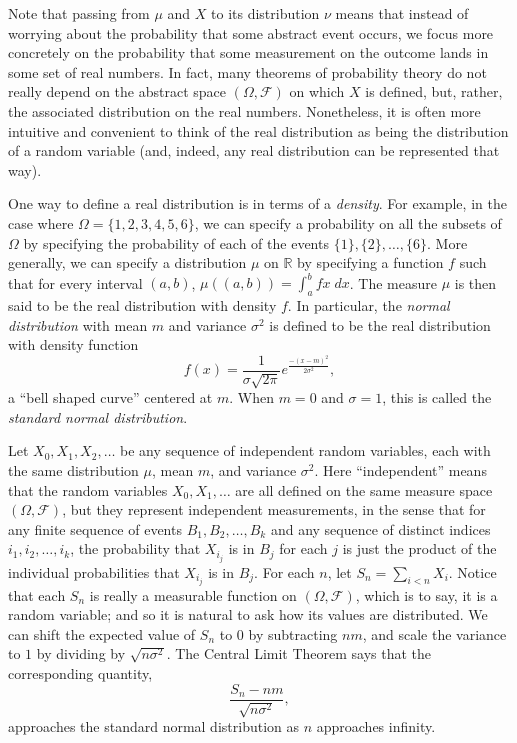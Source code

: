 \documentclass{svjour3}
\newcommand{\RR}{\mathbb{R}}
\newcommand{\mdl}[1]{{\mathcal #1}} %
\begin{document}
Note that passing from $\mu$ and $X$ to its distribution $\nu$ means that instead of worrying about the probability that some abstract event occurs, we focus more concretely on the probability that some measurement on the outcome lands in some set of real numbers. In fact, many theorems of probability theory do not really depend on the abstract space $(\Omega, \mdl F)$ on which $X$ is defined, but, rather, the associated distribution on the real numbers. Nonetheless, it is often more intuitive and convenient to think of the real distribution as being the distribution of a random variable (and, indeed, any real distribution can be represented that way). 

One way to define a real distribution is in terms of a \emph{density}. For example, in the case where $\Omega = \{1, 2, 3, 4, 5, 6\}$, we can specify a probability on all the subsets of $\Omega$ by specifying the probability of each of the events $\{1\}, \{2\}, \ldots, \{6\}$. More generally, we can specify a distribution $\mu$ on $\RR$ by specifying a function $f$ such that for every interval $(a, b)$, $\mu((a, b)) = \int_a^b f x \; \mathit{dx}$. The measure $\mu$ is then said to be the real distribution with density $f$. In particular, the \emph{normal distribution} with mean $m$ and variance $\sigma^2$ is defined to be the real distribution with density function
\[
f(x) = \frac{1}{\sigma \sqrt{2 \pi}} e^\frac{-(x - m)^2}{2 \sigma^2}, 
\]
a ``bell shaped curve'' centered at $m$. When $m = 0$ and $\sigma = 1$, this is called the \emph{standard normal distribution}.

Let $X_0, X_1, X_2, \ldots$ be any sequence of independent random variables, each with the same distribution $\mu$, mean $m$, and variance $\sigma^2$. Here ``independent'' means that the random variables $X_0, X_1, \ldots$ are all defined on the same measure space $(\Omega, \mdl F)$, but they represent independent measurements, in the sense that for any finite sequence of events $B_1, B_2, \ldots, B_k$ and any sequence of distinct indices $i_1, i_2, \ldots, i_k$, the probability that $X_{i_j}$ is in $B_j$ for each $j$ is just the product of the individual probabilities that $X_{i_j}$ is in $B_j$. For each $n$, let $S_n = \sum_{i < n} X_i$. Notice that each $S_n$ is really a measurable function on $(\Omega, \mdl F)$, which is to say, it is a random variable; and so it is natural to ask how its values are distributed. We can shift the expected value of $S_n$ to $0$ by subtracting $n m$, and scale the variance to $1$ by dividing by $\sqrt{ n \sigma^2}$. The Central Limit Theorem says that the corresponding quantity,
\[
 \frac{S_n - nm}{\sqrt{n \sigma^2}},
\]
approaches the standard normal distribution as $n$ approaches infinity.
\end{document}
